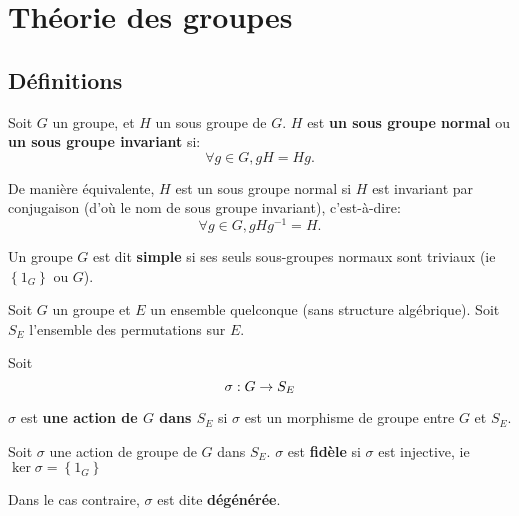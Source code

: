\chapter{Théorie des groupes}
\label{chapter_group_theory}

\section{Définitions}

\begin{definition}
	Soit $G$ un groupe, et $H$ un sous groupe de $G$.
	$H$ est \textbf{un sous groupe normal} ou \textbf{un sous groupe invariant}
	si:
	\begin{equation}
		\forall g \in G, gH = Hg.
		\label{definition_normal_subgroup}
	\end{equation}

	De manière équivalente, $H$ est un sous groupe normal si $H$ est invariant
	par conjugaison (d'où le nom de sous groupe invariant), c'est-à-dire:
	\begin{equation}
		\forall g \in G, gHg^{-1} = H.
		\label{definition_normal_subgroup2}
	\end{equation}
\end{definition}

\begin{definition}
	Un groupe $G$ est dit \textbf{simple} si ses seuls sous-groupes normaux sont
	triviaux (ie $\left\{ 1_{G} \right\}$ ou $G$).
\end{definition}

\begin{definition} 
	Soit $G$ un groupe et $E$ un ensemble quelconque (sans structure
	algébrique). Soit $S_{E}$ l'ensemble des permutations sur $E$.

	Soit
	\begin{equation}
		\sigma : G \rightarrow S_{E}
		\label{definition_group_action}
	\end{equation}

	$\sigma$ est \textbf{une action de $G$ dans $S_{E}$} si $\sigma$ est un
	morphisme de groupe entre $G$ et $S_{E}$.
\end{definition}

\begin{definition} 
	Soit $\sigma$ une action de groupe de $G$ dans $S_{E}$.
	$\sigma$ est \textbf{fidèle} si $\sigma$ est injective, ie $\ker{\sigma} =
	\left\{ 1_{G} \right\}$

	Dans le cas contraire, $\sigma$ est dite \textbf{dégénérée}.
\end{definition}

